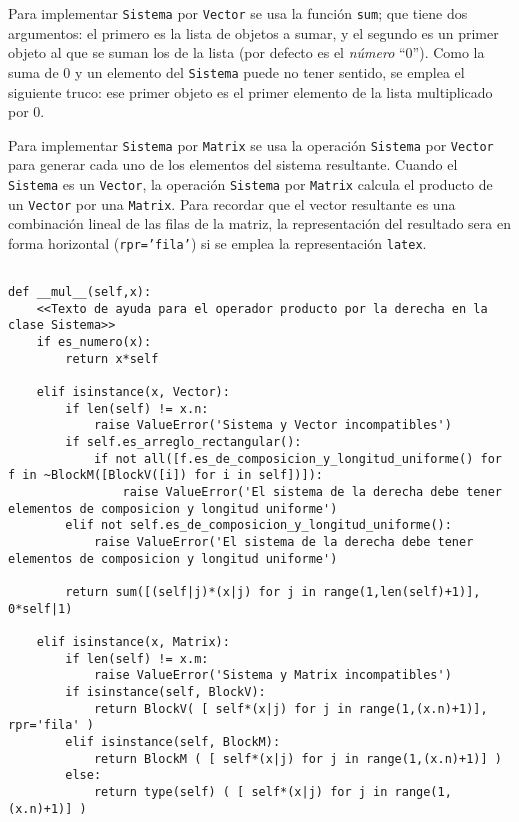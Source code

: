 \documentclass[11pt]{report}
\begin{document}
Para implementar \texttt{Sistema} por \texttt{Vector} se usa la función \texttt{sum}; que
tiene dos argumentos: el primero es la lista de objetos a sumar, y el
segundo es un primer objeto al que se suman los de la lista (por
defecto es el \emph{número} ``\(0\)''). Como la suma de \(0\) y un
elemento del \texttt{Sistema} puede no tener sentido, se emplea el siguiente
truco: ese primer objeto es el primer elemento de la lista
multiplicado por \(0\).

Para implementar \texttt{Sistema} por \texttt{Matrix} se usa la operación \texttt{Sistema}
por \texttt{Vector} para generar cada uno de los elementos del sistema
resultante. Cuando el \texttt{Sistema} es un \texttt{Vector}, la operación \texttt{Sistema}
por \texttt{Matrix} calcula el producto de un \texttt{Vector} por una \texttt{Matrix}. Para
recordar que el vector resultante es una combinación lineal de las
filas de la matriz, la representación del resultado sera en forma
horizontal (\texttt{rpr='fila'}) si se emplea la representación \texttt{latex}.

\begin{verbatim}

def __mul__(self,x):
    <<Texto de ayuda para el operador producto por la derecha en la clase Sistema>>
    if es_numero(x):
        return x*self

    elif isinstance(x, Vector):
        if len(self) != x.n:
            raise ValueError('Sistema y Vector incompatibles')
        if self.es_arreglo_rectangular():
            if not all([f.es_de_composicion_y_longitud_uniforme() for f in ~BlockM([BlockV([i]) for i in self])]):
                raise ValueError('El sistema de la derecha debe tener elementos de composicion y longitud uniforme')
        elif not self.es_de_composicion_y_longitud_uniforme():
            raise ValueError('El sistema de la derecha debe tener elementos de composicion y longitud uniforme')
            
        return sum([(self|j)*(x|j) for j in range(1,len(self)+1)], 0*self|1)
    
    elif isinstance(x, Matrix):
        if len(self) != x.m:
            raise ValueError('Sistema y Matrix incompatibles')
        if isinstance(self, BlockV):
            return BlockV( [ self*(x|j) for j in range(1,(x.n)+1)], rpr='fila' )
        elif isinstance(self, BlockM):
            return BlockM ( [ self*(x|j) for j in range(1,(x.n)+1)] )
        else:
            return type(self) ( [ self*(x|j) for j in range(1,(x.n)+1)] )

\end{verbatim}
\end{document}
